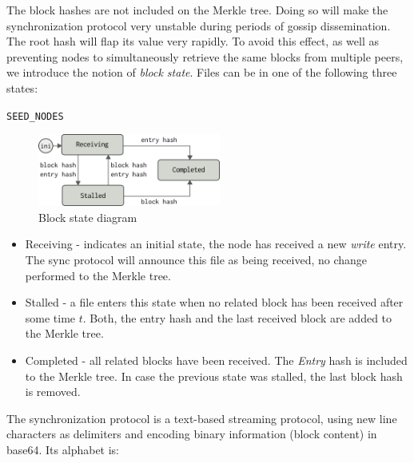 \documentclass{sig-alternate}
\begin{document}
The block hashes are not included on the Merkle tree. Doing so will make the synchronization protocol very unstable during periods of gossip dissemination. The root hash will flap its value very rapidly. To avoid this effect, as well as preventing nodes to simultaneously retrieve the same blocks from multiple peers, we introduce the notion of \textit{block state}. Files can be in one of the following three states:

\texttt{SEED\_NODES}

\begin{figure}[htp]
\centering
\includegraphics[width=170pt]{imgs/blockstate.png}
\caption{Block state diagram}
\label{fig:blockstate}
\end{figure}


\begin{itemize}
\item Receiving - indicates an initial state, the node has received a new \textit{write} entry. The sync protocol will announce this file as being received, no change performed to the Merkle tree.
\item Stalled - a file enters this state when no related block has been received after some time $t$. Both, the entry hash and the last received block are added to the Merkle tree.
\item Completed - all related blocks have been received. The \textit{Entry} hash is included to the Merkle tree. In case the previous state was stalled, the last block hash is removed.
\end{itemize}


The synchronization protocol is a text-based streaming protocol, using new line characters as delimiters and encoding binary information (block content) in base64. Its alphabet is:
\end{document}
